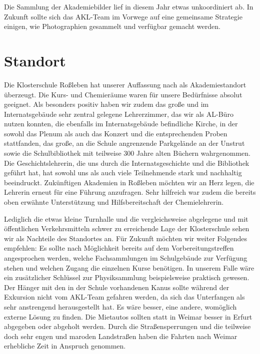 \documentclass{scrartcl}
\begin{document}
Die Sammlung der Akademiebilder lief in diesem Jahr etwas unkoordiniert ab. In Zukunft sollte sich das AKL-Team im Vorwege auf eine gemeinsame Strategie einigen, wie Photographien gesammelt und verf{\"u}gbar gemacht werden.\bigskip

\section*{Standort}

Die Klosterschule Ro{\ss}leben hat unserer Auffassung nach als Akademiestandort {\"u}berzeugt. Die Kurs- und Chemier{\"a}ume waren f{\"u}r unsere Bed{\"u}rfnisse absolut geeignet. Als besonders positiv haben wir zudem das gro{\ss}e und im Internatsgeb{\"a}ude sehr zentral gelegene Lehrerzimmer, das wir als AL-B{\"u}ro nutzen konnten, die ebenfalls im Internatsgeb{\"a}ude befindliche Kirche, in der sowohl das Plenum als auch das Konzert und die entsprechenden Proben stattfanden, das gro{\ss}e, an die Schule angrenzende Parkgel{\"a}nde an der Unstrut sowie die Schulbibliothek mit teilweise 300 Jahre alten B{\"u}chern wahrgenommen. Die Geschichtslehrerin, die uns durch die Internatsgeschichte und die Bibliothek gef{\"u}hrt hat, hat sowohl uns als auch viele Teilnehmende stark und nachhaltig beeindruckt. Zuk{\"u}nftigen Akademien in Ro{\ss}leben m{\"o}chten wir an Herz legen, die Lehrerin erneut f{\"u}r eine F{\"u}hrung anzufragen. Sehr hilfreich war zudem die bereits oben erw{\"a}hnte Unterst{\"u}tzung und Hilfsbereitschaft der Chemielehrerin.\medskip

Lediglich die etwas kleine Turnhalle und die vergleichsweise abgelegene und mit {\"o}ffentlichen Verkehrsmitteln schwer zu erreichende Lage der Klosterschule sehen wir als Nachteile des Standortes an. F{\"u}r Zukunft m{\"o}chten wir weiter Folgendes empfehlen: Es sollte nach M{\"o}glichkeit bereits auf dem Vorbereitungstreffen angesprochen werden, welche Fachsammlungen im Schulgeb{\"a}ude zur Verf{\"u}gung stehen und welchen Zugang die einzelnen Kurse ben{\"o}tigen. In unserem Falle w{\"a}re ein zus{\"a}tzlicher Schl{\"u}ssel zur Physiksammlung beispielsweise praktisch gewesen. Der H{\"a}nger mit den in der Schule vorhandenen Kanus sollte w{\"a}hrend der Exkursion nicht vom AKL-Team gefahren werden, da sich das Unterfangen als sehr anstrengend herausgestellt hat. Es w{\"a}re besser, eine andere, wom{\"o}glich externe L{\"o}sung zu finden. Die Mietautos sollten statt in Weimar besser in Erfurt abgegeben oder abgeholt werden. Durch die Stra{\ss}ensperrungen und die teilweise doch sehr engen und maroden Landstra{\ss}en haben die Fahrten nach Weimar erhebliche Zeit in Anspruch genommen.\bigskip
\end{document}
